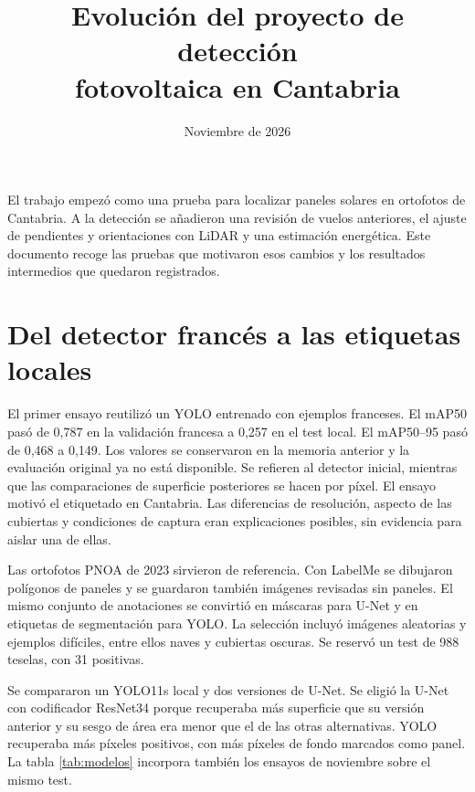 \documentclass[11pt,a4paper]{article}
\title{Evolución del proyecto de detección\\fotovoltaica en Cantabria}
\author{}
\date{Noviembre de 2026}
\begin{document}
\maketitle

El trabajo empezó como una prueba para localizar paneles solares en ortofotos de Cantabria. A la detección se añadieron una revisión de vuelos anteriores, el ajuste de pendientes y orientaciones con LiDAR y una estimación energética. Este documento recoge las pruebas que motivaron esos cambios y los resultados intermedios que quedaron registrados.

\section{Del detector francés a las etiquetas locales}

El primer ensayo reutilizó un YOLO entrenado con ejemplos franceses. El mAP50 pasó de 0,787 en la validación francesa a 0,257 en el test local. El mAP50--95 pasó de 0,468 a 0,149. Los valores se conservaron en la memoria anterior y la evaluación original ya no está disponible. Se refieren al detector inicial, mientras que las comparaciones de superficie posteriores se hacen por píxel. El ensayo motivó el etiquetado en Cantabria. Las diferencias de resolución, aspecto de las cubiertas y condiciones de captura eran explicaciones posibles, sin evidencia para aislar una de ellas.

Las ortofotos PNOA de 2023 sirvieron de referencia. Con LabelMe se dibujaron polígonos de paneles y se guardaron también imágenes revisadas sin paneles. El mismo conjunto de anotaciones se convirtió en máscaras para U-Net y en etiquetas de segmentación para YOLO. La selección incluyó imágenes aleatorias y ejemplos difíciles, entre ellos naves y cubiertas oscuras. Se reservó un test de 988 teselas, con 31 positivas.

Se compararon un YOLO11s local y dos versiones de U-Net. Se eligió la U-Net con codificador ResNet34 porque recuperaba más superficie que su versión anterior y su sesgo de área era menor que el de las otras alternativas. YOLO recuperaba más píxeles positivos, con más píxeles de fondo marcados como panel. La tabla \ref{tab:modelos} incorpora también los ensayos de noviembre sobre el mismo test.
\end{document}
